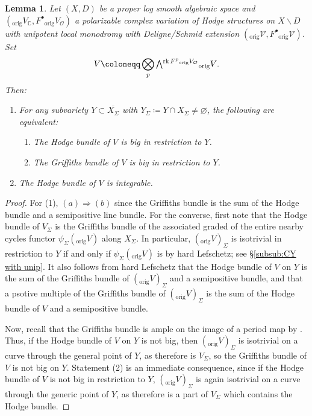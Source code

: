 \documentclass{amsart}
\newcommand{\bs}{\backslash}
\newtheorem{lem}[theorem]{Lemma}
\theoremstyle{definition}
\theoremstyle{remark}
\def\bC{\mathbb{C}}
\def\cO{\mathcal{O}}
\def\cV{\mathcal{V}}
\def\orig{\mathrm{orig}}
\def\rk{\operatorname{rk}}
\numberwithin{equation}{section}
\newcommand{\Exterior}{\mathchoice{{\textstyle\bigwedge}}%
    {{\bigwedge}}%
    {{\textstyle\wedge}}%
    {{\scriptstyle\wedge}}}
\begin{document}
\begin{lem}\label{lemma:Griffiths is integrable}Let $(X,D)$ be a proper log smooth algebraic space and $(_\orig V_\bC,F^\bullet {_\orig V_\cO})$ a polarizable complex variation of Hodge structures on $X\bs D$ with unipotent local monodromy with Deligne/Schmid extension $(_\orig\cV,F^\bullet{_\orig\cV})$.  Set  \[V\coloneqq  \bigotimes_p  \Exterior^{\rk F^p{_\orig V_\cO}}{_\orig V}.\]
Then:
\begin{enumerate}
\item For any subvariety $Y\subset \overline{X_\Sigma}$ with $Y_\Sigma\coloneqq  Y\cap X_\Sigma\neq\varnothing$, the following are equivalent: 
\begin{enumerate}
\item The Hodge bundle of $V$ is big in restriction to $Y$.
\item The Griffiths bundle of $V$ is big in restriction to $Y$.
\end{enumerate}
\item The Hodge bundle of $V$ is integrable.
\end{enumerate}
\end{lem}

\begin{proof}For (1), $(a)\Rightarrow(b)$ since the Griffiths bundle is the sum of the Hodge bundle and a semipositive line bundle. For the converse, first note that the Hodge bundle of $V_\Sigma$ is the Griffiths bundle of the associated graded of the entire nearby cycles functor $\psi_\Sigma ({_\orig V})$ along $X_\Sigma$.  
In particular, $(_\orig V)_\Sigma$ is isotrivial in restriction to $Y$ if and only if $\psi_\Sigma ({_\orig V})$ is by hard Lefschetz; see \S \ref{subsub:CY with unip}.  It also follows from hard Lefschetz that the Hodge bundle of $V$ on $Y$ is the sum of the Griffiths bundle of $(_\orig V)_\Sigma$ and a semipositive bundle, and that a psotive multiple of the Griffiths bundle of $(_\orig V)_\Sigma$ is the sum of the Hodge bundle of $V$ and a semipositive bundle.  

Now, recall that the Griffiths bundle is ample on the image of a period map
by \cite{BBT23}. Thus, if the Hodge bundle of $V$ on $Y$ is not big, then $(_\orig V)_\Sigma$ is isotrivial on a curve through the general point of $Y$, as therefore is $V_\Sigma$, so the Griffiths bundle of $V$ is not big on $Y$. 
Statement (2) is an immediate consequence, since if the Hodge bundle of $V$ is not big in restriction to $Y$,  $(_\orig V)_\Sigma$ is again isotrivial on a curve through the generic point of $Y$, as therefore is a part of $V_\Sigma$ which contains the Hodge bundle.
\end{proof}
\end{document}
